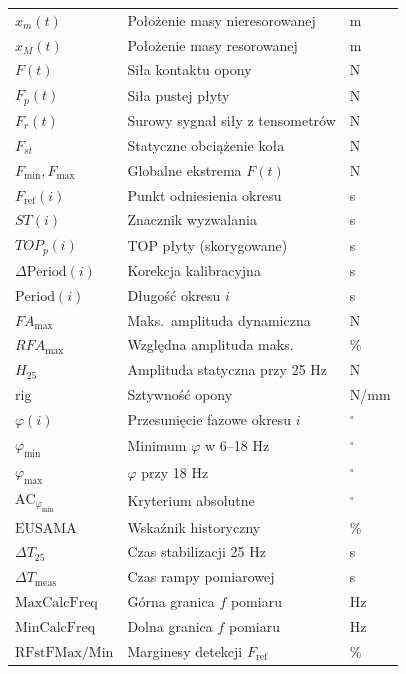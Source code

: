 \documentclass[11pt,a4paper]{article}
\theoremstyle{plainpol}
\begin{document}
\begin{longtable}{lll}
$x_m(t)$   & Położenie masy nieresorowanej      & m \\
$x_M(t)$   & Położenie masy resorowanej         & m \\
$F(t)$     & Siła kontaktu opony                & N \\
$F_p(t)$   & Siła pustej płyty                  & N \\
$F_r(t)$   & Surowy sygnał siły z tensometrów   & N \\
$F_{st}$   & Statyczne obciążenie koła          & N \\
$F_{\min},F_{\max}$ & Globalne ekstrema $F(t)$  & N \\
$F_{\mathrm{ref}}(i)$ & Punkt odniesienia okresu & s \\
$ST(i)$    & Znacznik wyzwalania                & s \\
$TOP_p(i)$ & TOP płyty (skorygowane)            & s \\
$\Delta\mathrm{Period}(i)$ & Korekcja kalibracyjna & s \\
$\mathrm{Period}(i)$ & Długość okresu $i$       & s \\
$FA_{\max}$ & Maks.~amplituda dynamiczna        & N \\
$RFA_{\max}$ & Względna amplituda maks.         & \% \\
$H_{25}$   & Amplituda statyczna przy 25 Hz     & N \\
$\mathrm{rig}$ & Sztywność opony                & N/mm \\
$\varphi(i)$ & Przesunięcie fazowe okresu $i$   & ${}^\circ$ \\
$\varphi_{\min}$ & Minimum $\varphi$ w 6--18 Hz & ${}^\circ$ \\
$\varphi_{\max}$ & $\varphi$ przy 18 Hz         & ${}^\circ$ \\
$\mathrm{AC}_{\varphi_{\min}}$ & Kryterium absolutne & ${}^\circ$ \\
$\mathrm{EUSAMA}$ & Wskaźnik historyczny        & \% \\
$\Delta T_{25}$ & Czas stabilizacji 25 Hz       & s \\
$\Delta T_{\mathrm{meas}}$ & Czas rampy pomiarowej & s \\
$\mathrm{MaxCalcFreq}$ & Górna granica $f$ pomiaru & Hz \\
$\mathrm{MinCalcFreq}$ & Dolna granica $f$ pomiaru & Hz \\
$\mathrm{RFstFMax/Min}$ & Marginesy detekcji $F_{\mathrm{ref}}$ & \% \\
\bottomrule
\end{longtable}
\end{document}
